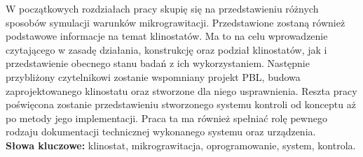 W początkowych rozdziałach pracy skupię się na przedstawieniu różnych sposobów symulacji warunków mikrograwitacji. Przedstawione zostaną również podstawowe informacje na temat
 klinostatów. Ma to na celu wprowadzenie czytającego w zasadę działania, konstrukcję oraz
  podział klinostatów, jak i przedstawienie obecnego stanu badań z ich wykorzystaniem. Następnie przybliżony czytelnikowi zostanie wspomniany projekt PBL, budowa zaprojektowanego klinostatu oraz stworzone dla niego usprawnienia. Reszta pracy poświęcona zostanie przedstawieniu stworzonego systemu kontroli od konceptu aż po metody jego implementacji. Praca ta ma również spełniać rolę pewnego rodzaju dokumentacji technicznej wykonanego systemu oraz urządzenia.\\
  

{\bf Słowa kluczowe:} klinostat, mikrograwitacja, oprogramowanie, system, kontrola.


